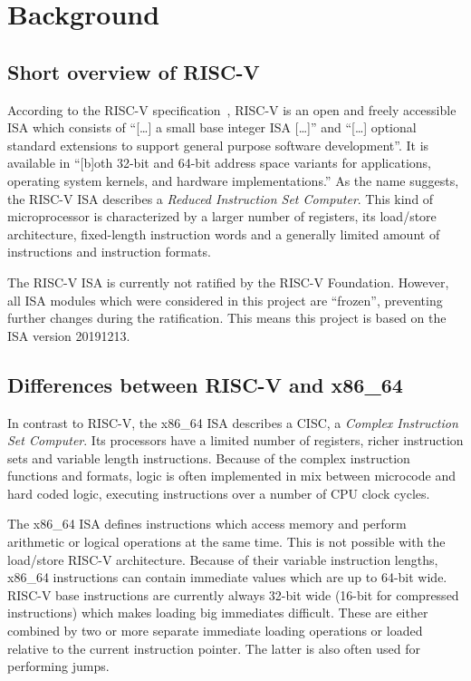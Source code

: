 \documentclass[course=eragp]{aspdoc}
\begin{document}
\section{Background}
\subsection{Short overview of RISC-V}
According to the RISC-V specification~\cite{rvspec}, RISC-V is an open and freely accessible ISA which 
consists of ``[\ldots] a small base integer ISA [\ldots]'' and ``[\ldots] optional standard extensions to support 
general purpose software development''\cite[p.~1]{rvspec}. It is available in ``[b]oth 32-bit and 64-bit address space variants for applications, operating system kernels, and
hardware implementations.''\cite[p.~1]{rvspec} As the name suggests, the RISC-V ISA describes a \emph{Reduced Instruction Set Computer}. This kind of microprocessor is
characterized by a larger number of registers, its load/store architecture, fixed-length instruction words and a generally limited amount of instructions and 
instruction formats.\cite{RISCvCISC}
\par
The RISC-V ISA is currently not ratified by the RISC-V Foundation. However, all ISA modules which were considered in this project are ``frozen'', 
preventing further changes during the ratification.\cite[p.~iv]{rvspec} This means this project is based on the ISA version 20191213.

\subsection{Differences between RISC-V and x86\_64}
In contrast to RISC-V, the x86\_64 ISA describes a CISC, a \emph{Complex Instruction Set Computer}. Its processors have a limited number of registers, 
richer instruction sets and variable length instructions. Because of the complex instruction functions and formats, 
logic is often implemented in mix between microcode and hard coded logic, executing instructions over a number of CPU clock cycles.\cite{RISCvCISC}
\par
The x86\_64 ISA defines instructions which access memory and perform arithmetic or logical operations at the same time. This is not possible
with the load/store RISC-V architecture. Because of their variable instruction lengths, x86\_64 instructions can contain immediate values which
are up to 64-bit wide.\cite[Vol.~2B~p.~4-35]{intel2017man} RISC-V base instructions are currently always 32-bit wide 
(16-bit for compressed instructions)\cite[p.~8]{rvspec} which makes loading big immediates difficult. These are either combined by two or more
separate immediate loading operations or loaded relative to the current instruction pointer.\cite[p.~19]{rvspec} The latter is also often used for performing jumps.\cite[p.~20]{rvspec}
\end{document}
